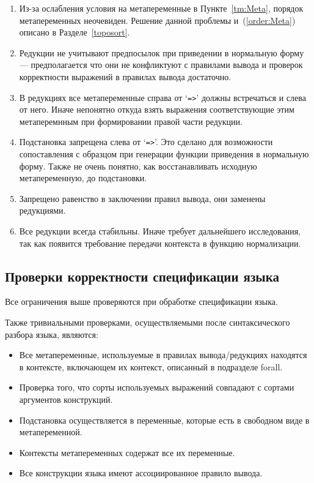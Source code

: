 \begin{enumerate}
\item Из-за ослабления условия на метапеременные в Пункте~\ref{tm:Meta}, порядок метапеременных неочевиден. Решение данной проблемы и~(\ref{order:Meta}) описано в Разделе~\ref{toposort}.

\item Редукции не учитывают предпосылок при приведении в нормальную форму --- предполагается что они не конфликтуют с правилами вывода и проверок корректности выражений в правилах вывода достаточно.

\item В редукциях все метапеременные справа от `\lstinline{=>}' должны встречаться и слева от него. Иначе непонятно откуда взять выражения соответствующие этим метаперемнным при формировании правой части редукции.

\item Подстановка запрещена слева от `\lstinline{=>}'. Это сделано для возможности сопоставления с образцом при генерации функции приведения в нормальную форму. Также не очень понятно, как восстанавливать исходную метапеременную, до подстановки.

\item Запрещено равенство в заключении правил вывода, они заменены редукциями.

\item Все редукции всегда стабильны. Иначе требует дальнейшего исследования, так как появится требование передачи контекста в функцию нормализации.

\end{enumerate}

\subsection{Проверки корректности спецификации языка}

Все ограничения выше проверяются при обработке спецификации языка.

Также тривиальными проверками, осуществляемыми после синтаксического разбора языка, являются:
\begin{itemize}
\item Все метапеременные, используемые в правилах вывода/редукциях находятся в контексте, включающем их контекст, описанный в подразделе forall.
\item Проверка того, что сорты используемых выражений совпадают с сортами аргументов конструкций.
\item Подстановка осуществляется в переменные, которые есть в свободном виде в метапеременной.
\item Контексты метапеременных содержат все их переменные.
\item Все конструкции языка имеют ассоциированное правило вывода.
\end{itemize}
